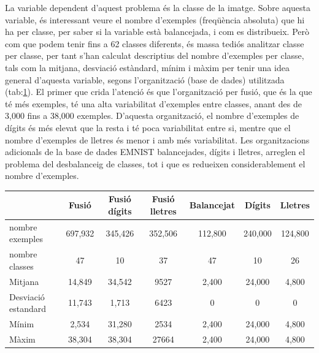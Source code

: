 \documentclass[12pt, spanish]{article}
\begin{document}
La variable dependent d'aquest problema és la classe de la imatge. Sobre aquesta variable, és interessant veure el nombre d'exemples (freqüència absoluta) que hi ha per classe, per saber si la variable està balancejada, i com es distribueix. Però com que podem tenir fins a 62 classes diferents, és massa tediós analitzar classe per classe, per tant s'han calculat descriptius del nombre d'exemples per classe, tals com la mitjana, desviació estàndard, mínim i màxim per tenir una idea general d'aquesta variable, segons l'organització (base de dades) utilitzada (tab:\ref{tab:taula1}). El primer que crida l'atenció és que l'organització per fusió, que és la que té més exemples, té una alta variabilitat d'exemples entre classes, anant des de 3,000 fins a 38,000 exemples. D'aquesta organització, el nombre d'exemples de dígits és més elevat que la resta i té poca variabilitat entre si, mentre que el nombre d'exemples de lletres és menor i amb més variabilitat. Les organitzacions adicionals de la base de dades EMNIST balancejades, dígits i lletres, arreglen el problema del desbalanceig de classes, tot i que es redueixen considerablement el nombre d'exemples. 

\begin{table}[hbt!]
\centering
\begin{tabular}{lcccccc}  
\toprule
                            & Fusió & Fusió dígits & Fusió lletres & Balancejat & Dígits & Lletres \\  
\midrule
nombre exemples    & 697,932 & 345,426  & 352,506 & 112,800 & 240,000 & 124,800 \\
nombre classes        & 47         & 10          & 37         & 47        & 10          & 26      \\
Mitjana                   & 14,849   & 34,542    & 9527     & 2,400    & 24,000    & 4,800 \\
Desviació estandard  & 11,743   & 1,713      & 6423    & 0           & 0            & 0       \\
Mínim                     & 2,534      & 31,280   & 2534    & 2,400      & 24,000   & 4,800 \\
Màxim                    & 38,304    & 38,304   & 27664   & 2,400      & 24,000   & 4,800 \\
\bottomrule
\end{tabular}
\label{tab:taula1}
\end{table}
\end{document}

